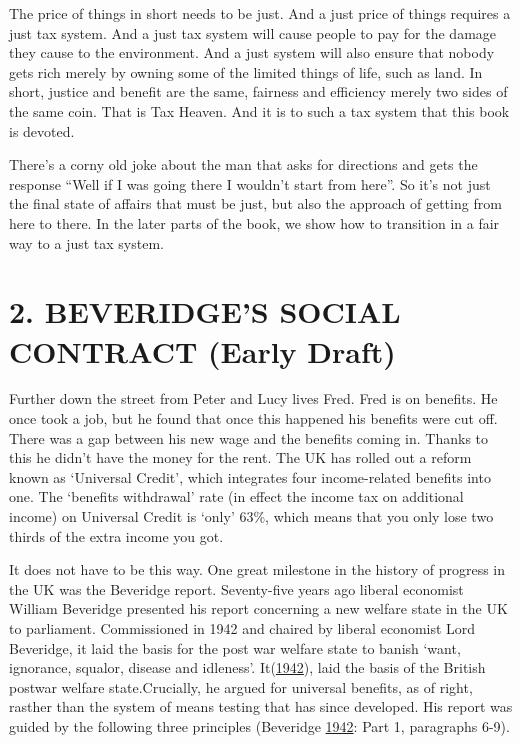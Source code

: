 \documentclass[]{tufte-handout}
\begin{document}
The price of things in short needs to be just. And a just price of
things requires a just tax system. And a just tax system will cause
people to pay for the damage they cause to the environment. And a just
system will also ensure that nobody gets rich merely by owning some of
the limited things of life, such as land. In short, justice and benefit
are the same, fairness and efficiency merely two sides of the same coin.
That is Tax Heaven. And it is to such a tax system that this book is
devoted.

There's a corny old joke about the man that asks for directions and gets
the response ``Well if I was going there I wouldn't start from here''.
So it's not just the final state of affairs that must be just, but also
the approach of getting from here to there. In the later parts of the
book, we show how to transition in a fair way to a just tax system.

\newpage

\hypertarget{beveridges-social-contract-early-draft}{%
\section{2. BEVERIDGE'S SOCIAL CONTRACT (Early
Draft)}\label{beveridges-social-contract-early-draft}}

Further down the street from Peter and Lucy lives Fred. Fred is on
benefits. He once took a job, but he found that once this happened his
benefits were cut off. There was a gap between his new wage and the
benefits coming in. Thanks to this he didn't have the money for the
rent. The UK has rolled out a reform known as `Universal Credit', which
integrates four income-related benefits into one. The `benefits
withdrawal' rate (in effect the income tax on additional income) on
Universal Credit is `only' 63\%, which means that you only lose two
thirds of the extra income you got.

It does not have to be this way. One great milestone in the history of
progress in the UK was the Beveridge report. Seventy-five years ago
liberal economist William Beveridge presented his report concerning a
new welfare state in the UK to parliament. Commissioned in 1942 and
chaired by liberal economist Lord Beveridge, it laid the basis for the
post war welfare state to banish `want, ignorance, squalor, disease and
idleness'. It(\protect\hyperlink{ref-Beveridge1942}{1942}), laid the
basis of the British postwar welfare state.Crucially, he argued for
universal benefits, as of right, rasther than the system of means
testing that has since developed. His report was guided by the following
three principles (Beveridge \protect\hyperlink{ref-Beveridge1942}{1942}:
Part 1, paragraphs 6-9).
\end{document}
